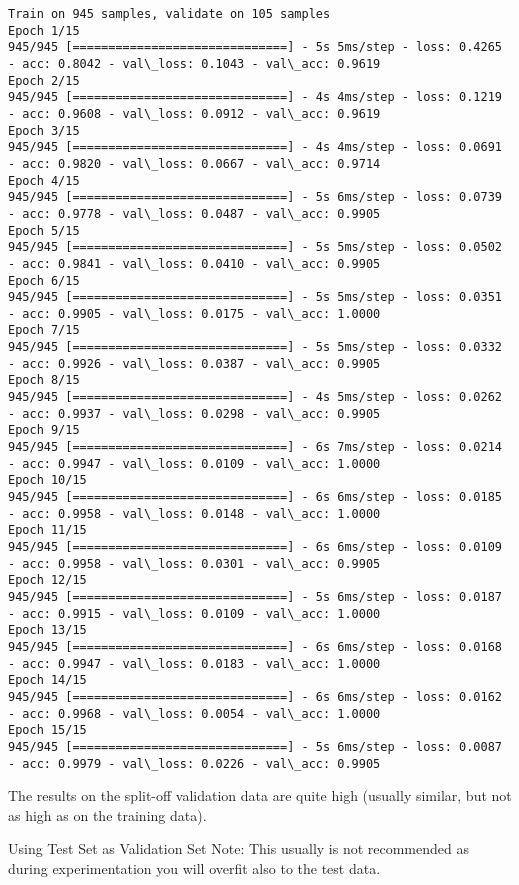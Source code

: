 \documentclass[11pt]{article}
\begin{document}
    \begin{Verbatim}[commandchars=\\\{\}]
Train on 945 samples, validate on 105 samples
Epoch 1/15
945/945 [==============================] - 5s 5ms/step - loss: 0.4265 - acc: 0.8042 - val\_loss: 0.1043 - val\_acc: 0.9619
Epoch 2/15
945/945 [==============================] - 4s 4ms/step - loss: 0.1219 - acc: 0.9608 - val\_loss: 0.0912 - val\_acc: 0.9619
Epoch 3/15
945/945 [==============================] - 4s 4ms/step - loss: 0.0691 - acc: 0.9820 - val\_loss: 0.0667 - val\_acc: 0.9714
Epoch 4/15
945/945 [==============================] - 5s 6ms/step - loss: 0.0739 - acc: 0.9778 - val\_loss: 0.0487 - val\_acc: 0.9905
Epoch 5/15
945/945 [==============================] - 5s 5ms/step - loss: 0.0502 - acc: 0.9841 - val\_loss: 0.0410 - val\_acc: 0.9905
Epoch 6/15
945/945 [==============================] - 5s 5ms/step - loss: 0.0351 - acc: 0.9905 - val\_loss: 0.0175 - val\_acc: 1.0000
Epoch 7/15
945/945 [==============================] - 5s 5ms/step - loss: 0.0332 - acc: 0.9926 - val\_loss: 0.0387 - val\_acc: 0.9905
Epoch 8/15
945/945 [==============================] - 4s 5ms/step - loss: 0.0262 - acc: 0.9937 - val\_loss: 0.0298 - val\_acc: 0.9905
Epoch 9/15
945/945 [==============================] - 6s 7ms/step - loss: 0.0214 - acc: 0.9947 - val\_loss: 0.0109 - val\_acc: 1.0000
Epoch 10/15
945/945 [==============================] - 6s 6ms/step - loss: 0.0185 - acc: 0.9958 - val\_loss: 0.0148 - val\_acc: 1.0000
Epoch 11/15
945/945 [==============================] - 6s 6ms/step - loss: 0.0109 - acc: 0.9958 - val\_loss: 0.0301 - val\_acc: 0.9905
Epoch 12/15
945/945 [==============================] - 5s 6ms/step - loss: 0.0187 - acc: 0.9915 - val\_loss: 0.0109 - val\_acc: 1.0000
Epoch 13/15
945/945 [==============================] - 6s 6ms/step - loss: 0.0168 - acc: 0.9947 - val\_loss: 0.0183 - val\_acc: 1.0000
Epoch 14/15
945/945 [==============================] - 6s 6ms/step - loss: 0.0162 - acc: 0.9968 - val\_loss: 0.0054 - val\_acc: 1.0000
Epoch 15/15
945/945 [==============================] - 5s 6ms/step - loss: 0.0087 - acc: 0.9979 - val\_loss: 0.0226 - val\_acc: 0.9905

    \end{Verbatim}

    The results on the split-off validation data are quite high (usually
similar, but not as high as on the training data).

    Using Test Set as Validation Set Note: This usually is not recommended
as during experimentation you will overfit also to the test data.
\end{document}
